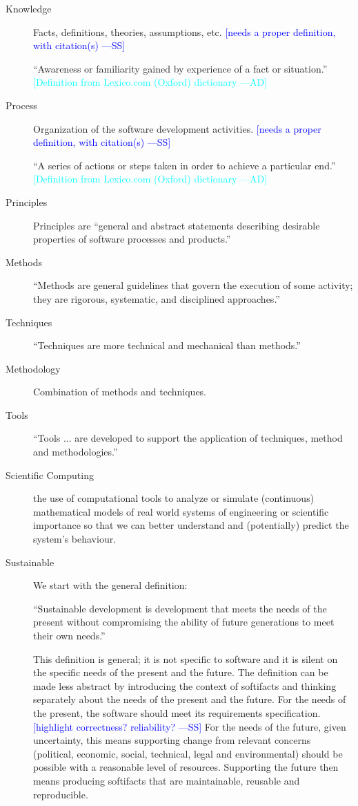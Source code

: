 \documentclass[12pt]{article}
\newcommand{\authornote}[3]{\textcolor{#1}{[#3 ---#2]}}
\newcommand{\authornote}[3]{}
\newcommand{\wss}[1]{\authornote{blue}{SS}{#1}} %
\newcommand{\ad}[1]{\authornote{cyan}{AD}{#1}} %
\begin{document}
\begin{description}
\item[Knowledge] Facts, definitions, theories, assumptions, etc. \wss{needs a
    proper definition, with citation(s)}

``Awareness or familiarity gained by experience of a fact or situation.'' \citep{OxfordKnowledge2020}
\ad{Definition from Lexico.com (Oxford) dictionary}

\item[Process] Organization of the software development activities.  \wss{needs a
    proper definition, with citation(s)}

``A series of actions or steps taken in order to achieve a particular end.''\citep{OxfordProcess2020}
\ad{Definition from Lexico.com (Oxford) dictionary}

\item[Principles] Principles are ``general and abstract statements describing
  desirable properties of software processes and products.''  \citep[p.\
  41]{GhezziEtAl2003}
\item[Methods] ``Methods are general guidelines that govern the execution of some activity;
  they are rigorous, systematic, and disciplined approaches.''  \citep[p.\
  41]{GhezziEtAl2003}
\item[Techniques] ``Techniques are more technical and mechanical than methods.''
  \cite[p.\ 41]{GhezziEtAl2003}
\item[Methodology] Combination of methods and techniques.  \citep[p.\
  41]{GhezziEtAl2003}
\item[Tools] ``Tools ... are developed to support the application of techniques,
  method and methodologies.'' \cite[p.\ 41]{GhezziEtAl2003}

\item[Scientific Computing] the use of computational tools to analyze or
  simulate (continuous) mathematical models of real world systems of engineering
  or scientific importance so that we can better understand and (potentially)
  predict the system's behaviour. \citep{SmithAndLai2005}
\item[Sustainable] We start with the general definition:

``Sustainable development is development that meets the needs
  of the present without compromising the ability of future generations to meet
  their own needs.'' \citep{Brundtland1987}

  This definition is general; it is not specific to software and it is silent on
  the specific needs of the present and the future.  The definition can be made
  less abstract by introducing the context of softifacts and thinking
  separately about the needs of the present and the future.  For the needs of
  the present, the software should meet its requirements specification.
  \wss{highlight correctness? reliability?}  For the
  needs of the future, given uncertainty, this means supporting change from
  relevant concerns (political, economic, social, technical, legal and
  environmental) should be possible with a reasonable level of resources.
  Supporting the future then means producing softifacts that are
  maintainable, reusable and reproducible.  


\end{description}
\end{document}
